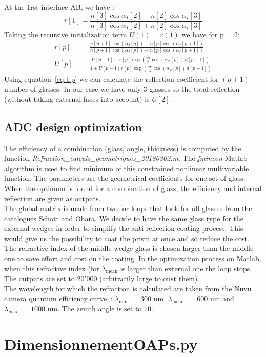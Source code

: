 At the 1rst interface AB, we have :
\begin{equation}
	r[1] = \frac{n[3]\cos\alpha_I[2]-n[2]\cos\alpha_I[3]}{n[3]\cos\alpha_I[2]+n[2]\cos\alpha_I[3]}
\end{equation}
Taking the recursive initialization term $U(1) = r(1)$ we have for p = 2:\\
\begin{eqnarray}
	r[p] &= &\frac{n[p+1]\cos\left(\alpha_I[p]\right)-n[p]\cos\left(\alpha_I[p+1]\right)}{n[p+1]\cos\left(\alpha_I[p]\right)+n[p]\cos\left(\alpha_I[p+1]\right)}\\
	U[p] &= &\frac{U[p-1]+r[p]\exp\left(\frac{2\pi}{\lambda}\cos\left(\alpha_Z[p]\right)\,d[p-1]\right)}{1+U[p-1]\,r[p]\exp\left(\frac{2\pi}{\lambda}\cos\left(\alpha_Z[p]\right)\,d[p-1]\right)}\label{eq:Up}
\end{eqnarray}
Using equation~\eqref{eq:Up} we can calculate the reflection coefficient for $(p+1)$ number of glasses. In our case we have only 3 glasses so the total reflection (without taking external faces into account) is $U[2]$.

\subsection{ADC design optimization}
The efficiency of a combination (glass, angle, thickness) is computed by the function \textit{Refraction\_calculs\_geometriques\_20180302.m}. The \textit{fmincon} Matlab algorithm is used to find minimum of this constrained nonlinear multivariable function. The parameters are the geometrical coefficients for one set of glass. When the optimum is found for a combination of glass, the efficiency and internal reflection are given as outputs.\\

The global matrix is made from two for-loops that look for all glasses from the catalogues Schott and Ohara. We decide to have the same glass type for the external wedges in order to simplify the anti-reflection coating process. This would give us the possibility to coat the prism at once and so reduce the cost. The refractive index of the middle wedge glass is chosen larger than the middle one to save effort and cost on the coating. In the optimization process on Matlab, when this refractive index (for $\lambda_\text{mean}$ is larger than external one the loop stops. The outputs are set to 20'000 (arbitrarily large to oust them).\\
The wavelength for which the refraction is calculated are taken from the Nuvu camera quantum efficiency curve~: $\lambda_\text{min}~=~300$ nm, $\lambda_\text{mean}~=~600$ nm and $\lambda_\text{max}~=~1000$ nm. The zenith angle is set to 70\degree.



\section{DimensionnementOAPs.py}\label{app:DimensionnementOAPs}














